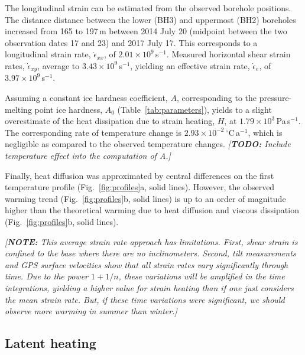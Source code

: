 \documentclass[utf8]{article}
\newcommand{\note}[1]{\textcolor{c0}{\emph{[\textbf{NOTE:} #1]}}}
\newcommand{\todo}[1]{\textcolor{c3}{\emph{[\textbf{TODO:} #1]}}}
\begin{document}
    The longitudinal strain can be estimated from the observed borehole
    positions. The distance distance between the lower (BH3) and uppermost
    (BH2) boreholes increased from 165 to 197\,m between 2014 July 20 (midpoint
    between the two observation dates 17 and 23) and 2017 July 17. This
    corresponds to a longitudinal strain rate, $\dot\epsilon_{xx}$, of
    $2.01\times10^9$\,s$^{-1}$. Measured horizontal shear strain rates,
    $\dot\epsilon_{xy}$, average to $3.43\times10^9$\,s$^{-1}$, yielding
    an effective strain rate, $\dot\epsilon_e$, of $3.97\times10^9$\,s$^{-1}$.

    Assuming a constant ice hardness coefficient, $A$, corresponding to the
    pressure-melting point ice hardness, $A_0$ (Table~\ref{tab:parameters}),
    yields to a slight overestimate of the heat dissipation due to strain
    heating, $H$, at $1.79\times10^3$\,Pa\,s$^{-1}$. The corresponding
    rate of temperature change is $2.93\times10^{-2}$\,$^{\circ}$C\,a$^{-1}$,
    which is negligible as compared to the observed temperature changes.
    \todo{Include temperature effect into the computation of A.}

    Finally, heat diffusion was approximated by central differences on the
    first temperature profile (Fig.~\ref{fig:profiles}a, solid lines).
    However, the observed warming trend (Fig.~\ref{fig:profiles}b, solid lines)
    is up to an order of magnitude higher than the theoretical warming due to
    heat diffusion and viscous dissipation (Fig.~\ref{fig:profiles}b, solid
    lines).

    \note{This average strain rate approach has limitations. First, shear
          strain is confined to the base where there are no inclinometers.
          Second, tilt measurements and GPS surface velocities show that all
          strain rates vary significantly through time. Due to the power
          $1+1/n$, these variations will be amplified in the time integrations,
          yielding a higher value for strain heating than if one just considers
          the mean strain rate. But, if these time variations were significant,
          we should observe more warming in summer than winter.}


\subsection{Latent heating}
\end{document}
